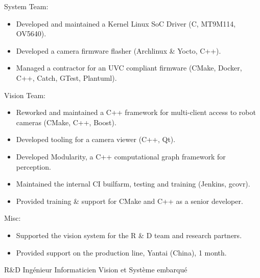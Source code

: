 \documentclass{article}
\begin{document}
\begin{llist}
{System Team:
\vspace{-0.33cm}
\begin{itemize}
	\item Developed and maintained a Kernel Linux SoC Driver (C, MT9M114, OV5640).
	\item Developed a camera firmware flasher (Archlinux \& Yocto, C++).
	\item Managed a contractor for an UVC compliant firmware (CMake, Docker, C++, Catch, GTest, Plantuml).
\end{itemize}
Vision Team:
\vspace{-0.33cm}
\begin{itemize}
	\item Reworked and maintained a C++ framework for multi-client access to robot cameras (CMake, C++, Boost).
	\item Developed tooling for a camera viewer (C++, Qt).
	\item Developed Modularity, a C++ computational graph framework for perception.
	\item Maintained the internal CI builfarm, testing and training (Jenkins,
		gcovr).
	\item Provided training \& support for CMake and C++ as a senior developer.
\end{itemize}
Misc:
\vspace{-0.33cm}
\begin{itemize}
	\item Supported the vision system for the R \& D team and research partners.
	\item Provided support on the production line, Yantai (China), 1 month.
\end{itemize}
} {
R\&D Ing\'{e}nieur Informaticien Vision et Syst\`{e}me embarqu\'{e}
\vspace{-0.33cm}

}
\end{llist}
\end{document}
